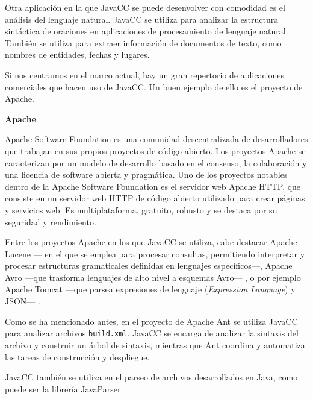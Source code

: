 Otra aplicación en la que JavaCC se puede desenvolver con comodidad es el análisis del lenguaje natural. JavaCC se utiliza para analizar la estructura sintáctica de oraciones en aplicaciones de procesamiento de lenguaje natural\cite{languageprocessing}. También se utiliza para extraer información de documentos de texto, como nombres de entidades, fechas y lugares.

Si nos centramos en el marco actual, hay un gran repertorio de aplicaciones comerciales que hacen uso de JavaCC. Un buen ejemplo de ello es el proyecto de Apache.

\phantom{text}

\noindent \textbf{Apache}

\phantom{text}

\noindent Apache Software Foundation es una comunidad descentralizada de desarrolladores que trabajan en sus propios proyectos de código abierto. Los proyectos Apache se caracterizan por un modelo de desarrollo basado en el consenso, la colaboración y una licencia de software abierta y pragmática\cite{apachepaginaoficial}. Uno de los proyectos notables dentro de la Apache Software Foundation es el servidor web Apache HTTP, que consiste en un servidor web HTTP de código abierto utilizado para crear páginas y servicios web. Es multiplataforma, gratuito, robusto y se destaca por su seguridad y rendimiento\cite{apachehttp}.

Entre los proyectos Apache en los que JavaCC se utiliza, cabe destacar Apache Lucene --- en el que se emplea para procesar consultas, permitiendo interpretar y procesar estructuras gramaticales definidas en lenguajes específicos---, Apache Avro ---que trasforma lenguajes de alto nivel a esquemas Avro--- , o por ejemplo Apache Tomcat ---que parsea expresiones de lenguaje (\textit{Expression Language})\cite{expressionlanguage} y JSON--- \cite{javaccgithub}.

Como se ha mencionado antes, en el proyecto de Apache Ant se utiliza JavaCC para analizar archivos \lstinline|build.xml|. JavaCC se encarga de analizar la sintaxis del archivo y construir un árbol de sintaxis, mientras que Ant coordina y automatiza las tareas de construcción y despliegue.

JavaCC también se utiliza en el parseo de archivos desarrollados en Java, como puede ser la librería JavaParser\cite{javaparser}. 



